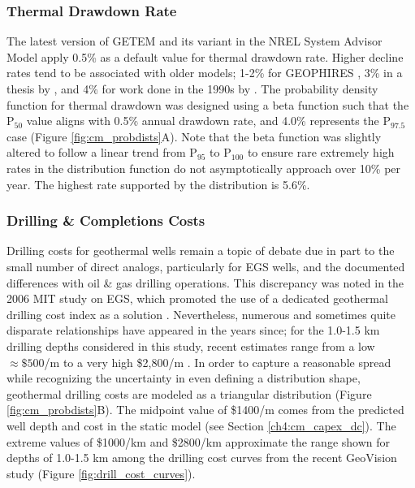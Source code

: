 \subsubsection{Thermal Drawdown Rate}\label{cm4:prob_tdr}
The latest version of GETEM \citep{mines_getem_2016} and its variant in the NREL System Advisor Model \citep{blair_system_2018} apply 0.5\% as a default value for thermal drawdown rate. Higher decline rates tend to be associated with older models; 1-2\% for GEOPHIRES \citep{beckers_low-temperature_2016}, 3\% in a thesis by \citet{augustine_hydrothermal_2009}, and 4\% for work done in the 1990s by \citet{tester_economic_1990}. The probability density function for thermal drawdown was designed using a beta function such that the P$_{50}$ value aligns with 0.5\% annual drawdown rate, and 4.0\% represents the P$_{97.5}$ case (Figure \ref{fig:cm_probdists}A). Note that the beta function was slightly altered to follow a linear trend from P$_{95}$ to P$_{100}$ to ensure rare extremely high rates in the distribution function do not asymptotically approach over 10\% per year. The highest rate supported by the distribution is 5.6\%.

\subsubsection{Drilling \& Completions Costs}\label{cm4:prob_dc}
Drilling costs for geothermal wells remain a topic of debate due in part to the small number of direct analogs, particularly for EGS wells, and the documented differences with oil \& gas drilling operations. This discrepancy was noted in the 2006 MIT study on EGS, which promoted the use of a dedicated geothermal drilling cost index as a solution \citep{tester_future_2006}. Nevertheless, numerous and sometimes quite disparate relationships have appeared in the years since; for the 1.0-1.5 km drilling depths considered in this study, recent estimates range from a low $\approx\$500$/m \citep{lukawski_uncertainty_2016} to a very high \$2,800/m \citep{lowry_implications_2017}. In order to capture a reasonable spread while recognizing the uncertainty in even defining a distribution shape, geothermal drilling costs are modeled as a triangular distribution (Figure \ref{fig:cm_probdists}B). The midpoint value of \$1400/m comes from the predicted well depth and cost in the static model (see Section \ref{ch4:cm_capex_dc}). The extreme values of \$1000/km and \$2800/km approximate the range shown for depths of 1.0-1.5 km among the drilling cost curves from the recent GeoVision study (Figure \ref{fig:drill_cost_curves}).

